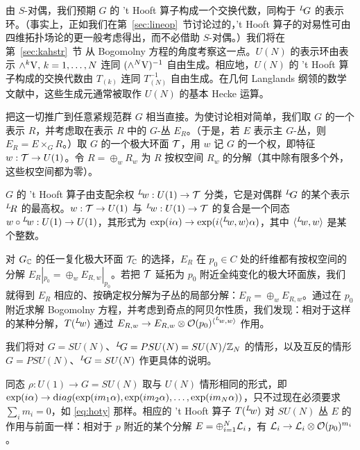 由 $S$-对偶，我们预期 $G$ 的 't Hooft 算子构成一个交换代数，同构于 $^L\negthinspace G$ 的表示环。（事实上，正如我们在第~\ref{sec:lineop}~节讨论过的，'t Hooft 算子的对易性可由四维拓扑场论的更一般考虑得出，而不必借助 $S$-对偶。）我们将在第~\ref{sec:kahstr}~节 从 Bogomolny 方程的角度考察这一点。$U(N)$ 的表示环由表示 $\wedge ^k\VV,\,k=1,\dots,N$ 连同 $(\wedge^N\VV)^{-1}$ 自由生成。相应地，$U(N)$ 的 't Hooft 算子构成的交换代数由 $T_{(k)}$ 连同 $T_{(N)}^{-1}$ 自由生成。在几何 Langlands 纲领的数学文献中，这些生成元通常被取作 $U(N)$ 的基本 Hecke 运算。

\par{}

把这一切推广到任意紧规范群 $G$ 相当直接。为使讨论相对简单，我们取 $G$ 的一个表示 $R$，并考虑取在表示 $R$ 中的 $G$-丛 $E_R$。（于是，若 $E$ 表示主 $G$-丛，则 $E_R=E\times_G R$。）取 $G$ 的一个极大环面 ${\cal T}$，用 $w$ 记 $G$ 的一个权，即特征 $w:{\cal T}\to U(1)$。令 $R=\oplus_wR_w$ 为 $R$ 按权空间 $R_w$ 的分解（其中除有限多个外，这些权空间都为零）。

$G$ 的 't Hooft 算子由支配余权 $^L\negthinspace w:U(1)\to {\cal T}$ 分类，它是对偶群 $^L\negthinspace G$ 的某个表示 $^L\negthinspace R$ 的最高权。$w:{\cal T}\to U(1)$ 与 $ ^L\negthinspace w:U(1)\to {\cal T}$ 的复合是一个同态 $w\circ{}^L\negthinspace w:U(1)\to U(1)$，其形式为 $\exp(i\alpha)\to \exp(i\langle ^L\negthinspace w,w\rangle\alpha)$，其中 $\langle ^L\negthinspace w,w\rangle$ 是某个整数。

对 $G_{\Bbb{C}}$ 的任一复化极大环面 ${\cal T}_{\Bbb{C}}$ 的选择，$E_R$ 在 $p_0\in C$ 处的纤维都有按权空间的分解 $E_R|_{p_0}=\oplus_w E_{R,w}|_{p_0}$。若把 ${\cal T}$ 延拓为 $p_0$ 附近全纯变化的极大环面族，我们就得到 $E_R$ 相应的、按确定权分解为子丛的局部分解：$E_R=\oplus_w {E}_{R,w}$。通过在 $p_0$ 附近求解 Bogomolny 方程，并考虑到奇点的阿贝尔性质，我们发现：相对于这样的某种分解，$T(^L\negthinspace w)$ 通过 ${E}_{R,w}\to {E}_{R,w}\otimes {\cal O}(p_0)^{\langle ^L\negthinspace w,w\rangle}$ 作用。

我们将对 $G=SU(N)$、$^L\negthinspace G=PSU(N)=SU(N)/\Bbb{Z}_N$ 的情形，以及互反的情形 $G=PSU(N)$、$^L\negthinspace G=SU(N)$ 作更具体的说明。

同态 $\rho:U(1)\to G=SU(N)$ 取与 $U(N)$ 情形相同的形式，即 $\exp(i\alpha)\to{\rm diag}(\exp({im_1\alpha}),\exp({im_2\alpha}),\dots,\exp(im_N\alpha))$，只不过现在必须要求 $\sum_im_i=0$，如 \eqref{eq:hoty} 那样。相应的 't Hooft 算子 $T(^L\negthinspace w)$ 对 $SU(N)$ 丛 $E$ 的作用与前面一样：相对于 $p$ 附近的某个分解 $E=\oplus_{i=1}^N{\cal L}_i$，有 ${\cal L}_i\to {\cal L}_i\otimes {\cal O}(p_0)^{m_i}$。

